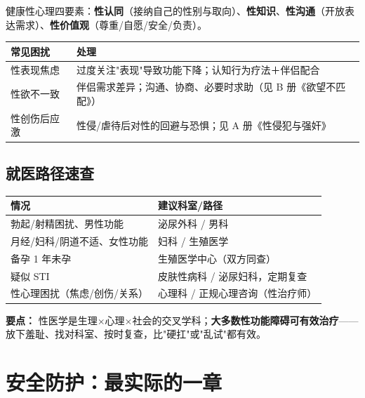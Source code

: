 \documentclass[12pt,UTF8,openany]{ctexbook}
\begin{document}
\noindent 健康性心理四要素：\textbf{性认同}（接纳自己的性别与取向）、\textbf{性知识}、\textbf{性沟通}（开放表达需求）、\textbf{性价值观}（尊重/自愿/安全/负责）。

\begin{tabularx}{\textwidth}{lX}
\toprule
常见困扰 & 处理 \\
\midrule
性表现焦虑 & 过度关注"表现"导致功能下降；认知行为疗法＋伴侣配合 \\
性欲不一致 & 伴侣需求差异；沟通、协商、必要时求助（见 B 册《欲望不匹配》） \\
性创伤后应激 & 性侵/虐待后对性的回避与恐惧；见 A 册《性侵犯与强奸》 \\
\bottomrule
\end{tabularx}

\section{就医路径速查}

\begin{tabularx}{\textwidth}{lX}
\toprule
情况 & 建议科室/路径 \\
\midrule
勃起/射精困扰、男性功能 & 泌尿外科 / 男科 \\
月经/妇科/阴道不适、女性功能 & 妇科 / 生殖医学 \\
备孕 1 年未孕 & 生殖医学中心（双方同查） \\
疑似 STI & 皮肤性病科 / 泌尿妇科，定期复查 \\
性心理困扰（焦虑/创伤/关系） & 心理科 / 正规心理咨询（性治疗师） \\
\bottomrule
\end{tabularx}

\vspace{1em}
\noindent\textbf{要点：} 性医学是生理$\times$心理$\times$社会的交叉学科；\textbf{大多数性功能障碍可有效治疗}——放下羞耻、找对科室、按时复查，比"硬扛"或"乱试"都有效。

\chapter{安全防护：最实际的一章}
\end{document}
